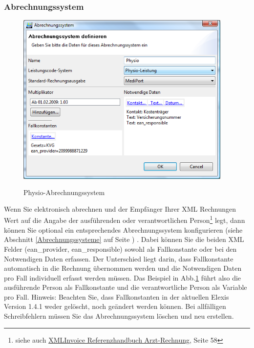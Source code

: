 \documentclass[a4paper]{scrartcl}
\begin{document}
\subsubsection{Abrechnungssystem}
\begin{figure}
  \includegraphics[width=0.95\textwidth]{abr25}\\
  \caption{Physio-Abrechnungssystem}\label{fig:abr25}
\end{figure}
Wenn Sie elektronisch abrechnen und der Empfänger Ihrer XML Rechnungen Wert auf die Angabe der ausführenden oder verantwortlichen Person\footnote{siehe auch \href{http://www.forum-datenaustausch.ch/mdinvoicerequest_xml4.00_v1.2_d.pdf}{XMLInvoice Referenzhandbuch Arzt-Rechnung}, Seite 58} legt, dann können Sie optional ein entsprechendes Abrechnungssystem konfigurieren (siehe Abschnitt \ref{Abrechnungssysteme} auf Seite \pageref{Abrechnungssysteme})
. Dabei können Sie die beiden XML Felder (ean\_provider, ean\_responsible) sowohl als Fallkonstante oder bei den Notwendigen Daten erfassen. Der Unterschied liegt darin, dass Fallkonstante automatisch in die Rechnung übernommen werden und die Notwendigen Daten pro Fall individuell erfasst werden müssen. Das Beispiel in Abb.\ref{fig:abr25} führt also die ausführende Person als Fallkonstante und die verantwortliche Person als Variable pro Fall.\linebreak
Hinweis: Beachten Sie, dass Fallkonstanten in der aktuellen Elexis Version 1.4.1 weder gelöscht, noch geändert werden können. Bei allfälligen Schreibfehlern müssen Sie das Abrechnungssystem löschen und neu erstellen.
\end{document}
